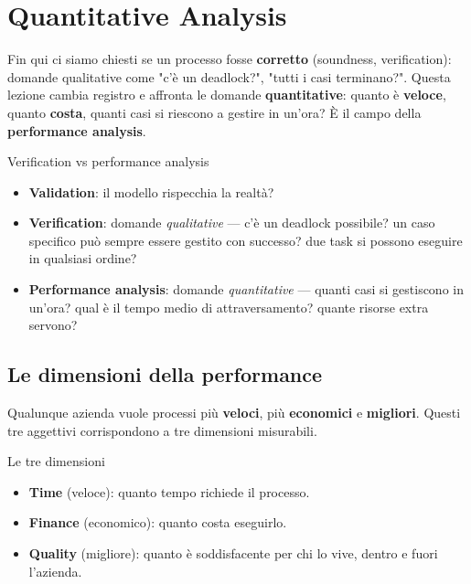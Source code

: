 \chapter{\texorpdfstring{Quantitative Analysis}{Quantitative Analysis}}
\label{ch:20}

Fin qui ci siamo chiesti se un processo fosse \textbf{corretto} (soundness, verification): domande qualitative come "c'è un deadlock?", "tutti i casi terminano?". Questa lezione cambia registro e affronta le domande \textbf{quantitative}: quanto è \textbf{veloce}, quanto \textbf{costa}, quanti casi si riescono a gestire in un'ora? È il campo della \textbf{performance analysis}.

\begin{boxnote}{Verification vs performance analysis}
\begin{itemize}
\item \textbf{Validation}: il modello rispecchia la realtà?
\item \textbf{Verification}: domande \emph{qualitative} — c'è un deadlock possibile? un caso specifico può sempre essere gestito con successo? due task si possono eseguire in qualsiasi ordine?
\item \textbf{Performance analysis}: domande \emph{quantitative} — quanti casi si gestiscono in un'ora? qual è il tempo medio di attraversamento? quante risorse extra servono?
\end{itemize}
\end{boxnote}

\section{\texorpdfstring{Le dimensioni della performance}{Le dimensioni della performance}}

Qualunque azienda vuole processi più \textbf{veloci}, più \textbf{economici} e \textbf{migliori}. Questi tre aggettivi corrispondono a tre dimensioni misurabili.

\begin{boxdefinition}{Le tre dimensioni}
\begin{itemize}
\item \textbf{Time} (veloce): quanto tempo richiede il processo.
\item \textbf{Finance} (economico): quanto costa eseguirlo.
\item \textbf{Quality} (migliore): quanto è soddisfacente per chi lo vive, dentro e fuori l'azienda.
\end{itemize}
\end{boxdefinition}

